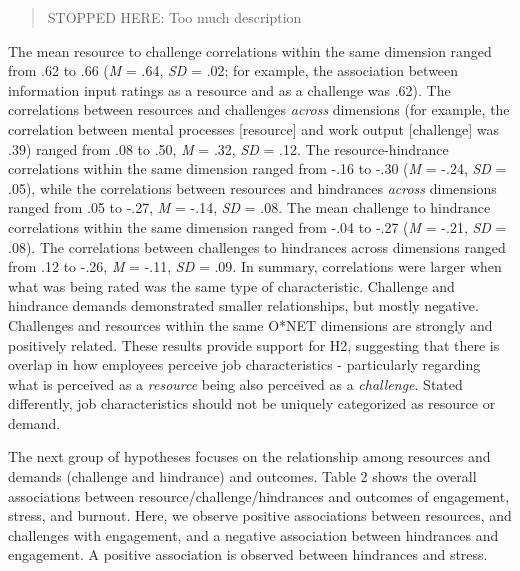 \documentclass[
  man]{apa7}
\begin{document}
\begin{quote}
STOPPED HERE: Too much description
\end{quote}

The mean resource to challenge correlations within the same dimension ranged from .62 to .66 (\emph{M} = .64, \emph{SD} = .02; for example, the association between information input ratings as a resource and as a challenge was .62). The correlations between resources and challenges \emph{across} dimensions (for example, the correlation between mental processes {[}resource{]} and work output {[}challenge{]} was .39) ranged from .08 to .50, \emph{M} = .32, \emph{SD} = .12. The resource-hindrance correlations within the same dimension ranged from -.16 to -.30 (\emph{M} = -.24, \emph{SD} = .05), while the correlations between resources and hindrances \emph{across} dimensions ranged from .05 to -.27, \emph{M} = -.14, \emph{SD} = .08. The mean challenge to hindrance correlations within the same dimension ranged from -.04 to -.27 (\emph{M} = -.21, \emph{SD} = .08). The correlations between challenges to hindrances across dimensions ranged from .12 to -.26, \emph{M} = -.11, \emph{SD} = .09. In summary, correlations were larger when what was being rated was the same type of characteristic. Challenge and hindrance demands demonstrated smaller relationships, but mostly negative. Challenges and resources within the same O*NET dimensions are strongly and positively related. These results provide support for H2, suggesting that there is overlap in how employees perceive job characteristics - particularly regarding what is perceived as a \emph{resource} being also perceived as a \emph{challenge}. Stated differently, job characteristics should not be uniquely categorized as resource or demand.

The next group of hypotheses focuses on the relationship among resources and demands (challenge and hindrance) and outcomes. Table 2 shows the overall associations between resource/challenge/hindrances and outcomes of engagement, stress, and burnout. Here, we observe positive associations between resources, and challenges with engagement, and a negative association between hindrances and engagement. A positive association is observed between hindrances and stress.
\end{document}
